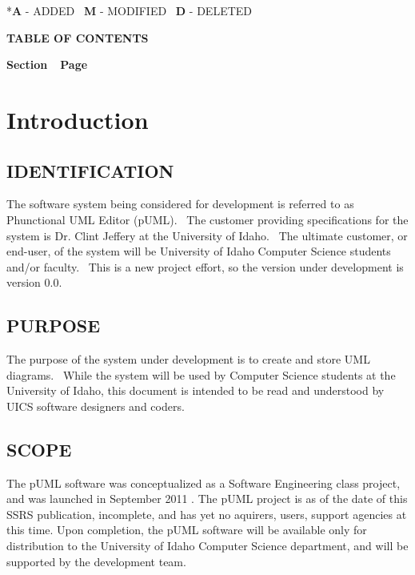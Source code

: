 \documentclass[twoside,letterpaper]{article}
\begin{document}
{
\foreignlanguage{english}{*}\foreignlanguage{english}{\textbf{A}}\foreignlanguage{english}{
- ADDED
\ }\foreignlanguage{english}{\textbf{M}}\foreignlanguage{english}{ -
MODIFIED
\ }\foreignlanguage{english}{\textbf{D}}\foreignlanguage{english}{ -
DELETED}}


{\centering\bfseries
TABLE OF CONTENTS
\par}


\bigskip

{\bfseries
Section\ \ Page}

\setcounter{tocdepth}{9}
\renewcommand\contentsname{}
\tableofcontents

\bigskip








\clearpage\clearpage\setcounter{page}{1}\pagestyle{Convertii}
\section[Introduction]{\rmfamily\bfseries
Introduction}

\subsection[IDENTIFICATION]{\rmfamily\bfseries
IDENTIFICATION}
{
The software system being considered for development is referred to as Phunctional UML Editor (pUML). \ The customer providing specifications
for the system is Dr. Clint Jeffery at the University of Idaho. \ The ultimate
customer, or end-user, of the system will be University of Idaho Computer Science students and/or faculty. \ This is a new project effort, so the version under development is version 0.0.}

\subsection[PURPOSE]{\rmfamily\bfseries
PURPOSE}
{
The purpose of the system under development is to create and store UML diagrams.
\ While the system will be used by Computer Science students at the University of Idaho,
this document is intended to be read and understood by UICS software
designers and coders.}

\subsection[SCOPE]{\rmfamily\bfseries
SCOPE}
{
The pUML software was conceptualized as a Software Engineering class project, and was launched in September 2011 .  The pUML project is as of the date of this SSRS publication, incomplete, and has yet no aquirers, users, support agencies at this time. Upon completion, the pUML software will be available only for distribution to the University of Idaho Computer Science department, and will be supported by the development team. }
\end{document}
